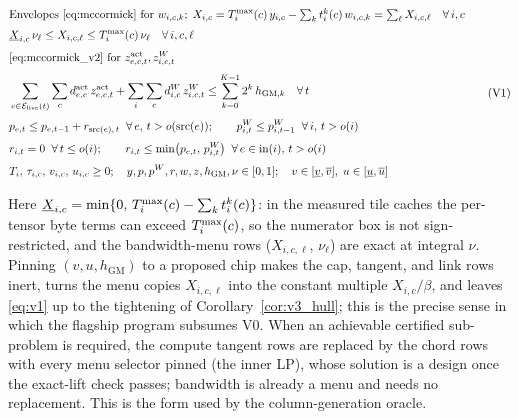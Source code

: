 \begin{equation}
\begin{aligned}
& \text{Envelopes~\eqref{eq:mccormick} for } w_{i,c,k};\;
  X_{i,c} = T^{\max}_i(c)\,y_{i,c} - \textstyle\sum_k t_i^k(c)\,w_{i,c,k} = \textstyle\sum_{\ell} X_{i,c,\ell}
  \quad \forall\, i, c \\[3pt]
& \underline X_{i,c}\,\nu_\ell \le X_{i,c,\ell} \le T^{\max}_i(c)\,\nu_\ell
  \quad \forall\, i, c, \ell \\[3pt]
& 
  \text{\eqref{eq:mccormick_v2} for } z^{\mathrm{act}}_{e,c,t}, z^{W}_{i,c,t} \\[3pt]
& \sum_{e \in \mathcal{E}_{\mathrm{live}}(t)} \sum_{c}
    d^{\mathrm{act}}_{e,c}\, z^{\mathrm{act}}_{e,c,t}
  + \sum_{i} \sum_{c} d^{W}_{i,c}\, z^{W}_{i,c,t}
  \leq \sum_{k=0}^{K-1} 2^{k}\, h_{\mathrm{GM},k}
  \quad \forall\, t \\[3pt]
& p_{e,t} \leq p_{e,t-1} + r_{\text{src}(e),\, t} \;\;\forall\, e,\, t > o(\text{src}(e)); \qquad
  p_{i,t}^W \leq p_{i,t-1}^W \;\;\forall\, i,\, t > o(i) \\[3pt]
& r_{i,t} = 0 \;\;\forall\, t \leq o(i); \qquad
  r_{i,t} \leq \min\!\big(p_{e,t},\, p_{i,t}^W\big)
  \;\;\forall\, e \in \text{in}(i),\, t > o(i) \\[3pt]
& T_i,\, \tau_{i,c},\, v_{i,c},\, u_{i,c} \geq 0; \quad
  y, p, p^W, r, w, z, h_{\mathrm{GM}}, \nu \in [0,1]; \quad
  v \in [\underline v, \overline v],\; u \in [\underline u, \overline u]
\end{aligned}
\tag{V1}\label{eq:v1}
\end{equation}

Here $\underline X_{i,c}=\min\{0,\,T^{\max}_i(c)-\sum_k t_i^k(c)\}$: in the
measured tile caches the per-tensor byte terms can exceed $T^{\max}_i(c)$, so the
numerator box is not sign-restricted, and the bandwidth-menu rows
($X_{i,c,\ell}$, $\nu_\ell$) are exact at integral $\nu$.
Pinning $(v,u,h_{\mathrm{GM}})$ to a proposed chip makes the cap, tangent, and
link rows inert, turns the menu copies $X_{i,c,\ell}$ into the constant multiple
$X_{i,c}/\beta$, and leaves
\eqref{eq:v1} up to the tightening of Corollary~\ref{cor:v3_hull}; this is the
precise sense in which the flagship program subsumes V0. When an achievable
certified sub-problem is required, the compute tangent rows are replaced by the
chord rows with every menu selector pinned (the inner LP), whose solution is a
design once the exact-lift check passes; bandwidth is already a menu and needs no
replacement. This is the form used by the column-generation oracle.


